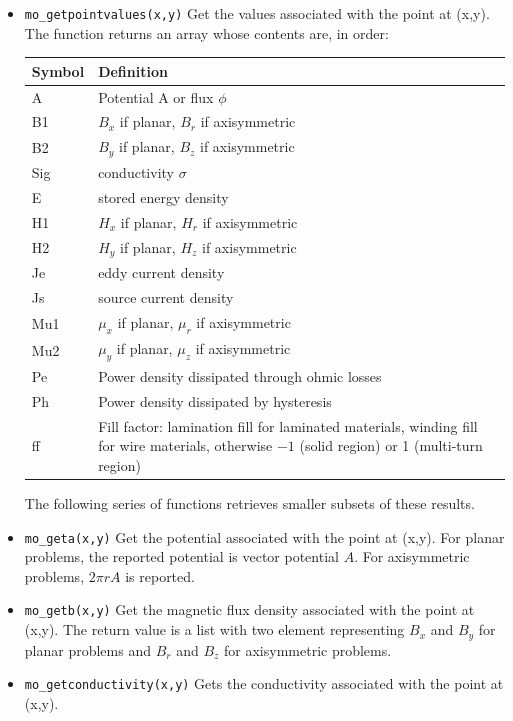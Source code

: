 \begin{itemize}
\item{\tt mo\_getpointvalues(x,y)}
Get the values associated with the point at (x,y).  The function returns an array whose contents are, in order:
\begin{center}
\begin{tabular}{ll} \hline
Symbol & Definition \\ \hline
 A & Potential A or flux $\phi$ \\
 B1 &  $B_x$ if planar, $B_r$ if axisymmetric \\
 B2  & $B_y$ if planar, $B_z$ if axisymmetric \\
 Sig & conductivity $\sigma$ \\
 E & stored energy density\\
 H1 & $H_x$ if planar, $H_r$ if axisymmetric \\
 H2 &  $H_y$ if planar, $H_z$ if axisymmetric \\
 Je & eddy current density \\
 Js & source current density\\
 Mu1 & $\mu_x$ if planar, $\mu_r$ if axisymmetric \\
 Mu2 & $\mu_y$ if planar, $\mu_z$ if axisymmetric \\
 Pe & Power density dissipated through ohmic losses \\
 Ph & Power density dissipated by hysteresis \\
 ff & Fill factor: lamination fill for laminated materials, winding fill for wire materials, otherwise $-1$ (solid region) or 1 (multi-turn region) \\ \hline
 \end{tabular}
\end{center}
The following series of functions retrieves smaller subsets of
these results.

\item{\tt mo\_geta(x,y)} Get the potential associated with the point at (x,y).
For planar problems, the reported potential is vector potential
$A$.  For axisymmetric problems, $2 \pi r A$ is reported.

\item{\tt mo\_getb(x,y)} Get the magnetic flux density associated with the point at (x,y).
The return value is a list with two element representing $B_x$ and
$B_y$ for planar problems and $B_r$ and $B_z$ for axisymmetric
problems.

\item{\tt mo\_getconductivity(x,y)} Gets the conductivity associated with the point at (x,y).


\end{itemize}

